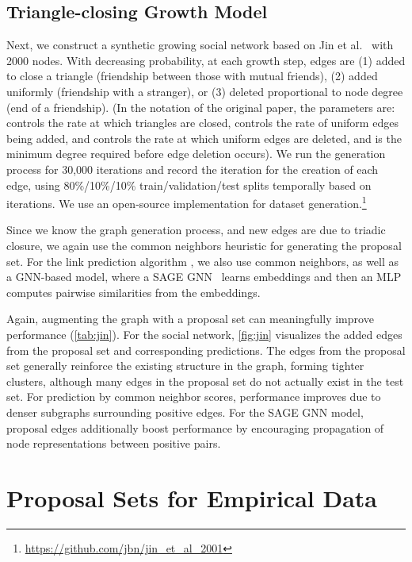 \documentclass{article}
\begin{document}
\subsection{Triangle-closing Growth Model}
\label{sec:jin}
Next, we construct a synthetic growing social network based on Jin et al.~\cite{Jin2001StructureOG} with 2000 nodes.
With decreasing probability, at each growth step, edges are
(1) added to close a triangle (friendship between those with mutual friends), 
(2) added uniformly (friendship with a stranger), or 
(3) deleted proportional to node degree (end of a friendship). 
(In the notation of the original paper, the parameters are: 
 controls the rate at which triangles are closed, 
 controls the rate of uniform edges being added, and
 controls the rate at which uniform edges are deleted, 
and  is the minimum degree required before edge deletion occurs).
We run the generation process for 30,000 iterations and record the iteration for the creation of each edge,
using 80\%/10\%/10\% train/validation/test splits temporally based on iterations.
We use an open-source implementation for dataset generation.\footnote{\url{https://github.com/jbn/jin_et_al_2001}}

Since we know the graph generation process, and new edges are due to triadic closure, 
we again use the common neighbors heuristic for generating the proposal set.
For the link prediction algorithm , we also use common neighbors, 
as well as a GNN-based model, where a SAGE GNN~\cite{Hamilton2017InductiveRL} learns embeddings and then an MLP computes pairwise similarities from the embeddings.

Again, augmenting the graph with a proposal set can meaningfully improve performance (\cref{tab:jin}). 
For the social network, \cref{fig:jin} visualizes the added edges from the proposal set and corresponding predictions.
The edges from the proposal set generally reinforce the existing structure in the graph, forming tighter clusters,
although many edges in the proposal set do not actually exist in the test set.
For prediction by common neighbor scores, performance improves due to denser subgraphs surrounding positive edges. 
For the SAGE GNN model, proposal edges additionally boost performance by encouraging propagation of node representations between positive pairs.

\section{Proposal Sets for Empirical Data}\label{experiment}
\end{document}
